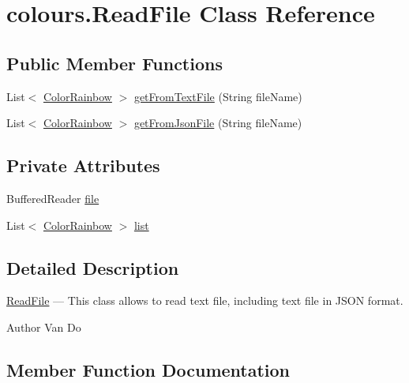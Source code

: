\hypertarget{classcolours_1_1_read_file}{}\section{colours.\+Read\+File Class Reference}
\label{classcolours_1_1_read_file}
\subsection*{Public Member Functions}
\begin{DoxyCompactItemize}
\item 
List$<$ \hyperlink{classcolours_1_1_color_rainbow}{Color\+Rainbow} $>$ \hyperlink{classcolours_1_1_read_file_a6b240cdce8df090dca527f367bacb95b}{get\+From\+Text\+File} (String file\+Name)
\item 
List$<$ \hyperlink{classcolours_1_1_color_rainbow}{Color\+Rainbow} $>$ \hyperlink{classcolours_1_1_read_file_a66c626180f88d15c7833677481eede05}{get\+From\+Json\+File} (String file\+Name)
\end{DoxyCompactItemize}
\subsection*{Private Attributes}
\begin{DoxyCompactItemize}
\item 
Buffered\+Reader \hyperlink{classcolours_1_1_read_file_a3d7ab6f2517fbc88e36249963255930a}{file}
\item 
List$<$ \hyperlink{classcolours_1_1_color_rainbow}{Color\+Rainbow} $>$ \hyperlink{classcolours_1_1_read_file_ada4823ab03166bb5b0c388b40460fa7d}{list}
\end{DoxyCompactItemize}


\subsection{Detailed Description}
\hyperlink{classcolours_1_1_read_file}{Read\+File} --- This class allows to read text file, including text file in J\+S\+ON format. \begin{DoxyAuthor}{Author}
Van Do 
\end{DoxyAuthor}


\subsection{Member Function Documentation}
\mbox{\label{classcolours_1_1_read_file_a66c626180f88d15c7833677481eede05}} 
